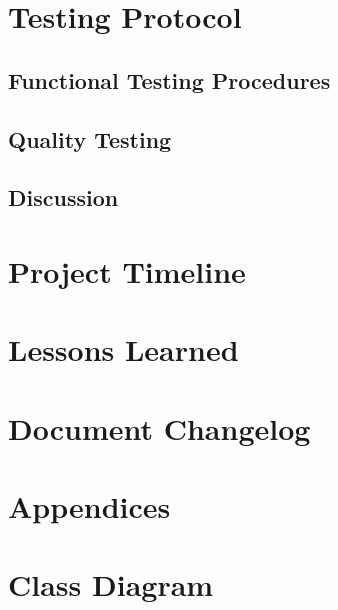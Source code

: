 \documentclass{article}
\begin{document}
	\section{Testing Protocol}
	\subsection{Functional Testing Procedures}
	
	
	\subsection{Quality Testing}
	
	
	\subsection{Discussion}
	
	\pagebreak
	

	
	\section{Project Timeline}
	
	\pagebreak
	
	\section{Lessons Learned}
	
	\pagebreak
	
	\section{Document Changelog}
	
	\pagebreak
	
	\appendix
	\section*{Appendices}
	\section{Class Diagram}
\end{document}
